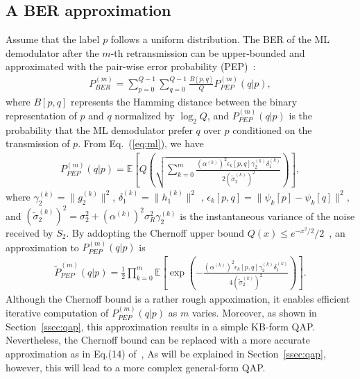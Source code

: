 \documentclass{article}
\begin{document}
\subsection{A BER approximation}
\label{ssec:ber}
Assume that the label $p$ follows a uniform distribution. The BER of
the ML demodulator after the $m$-th retransmission can be upper-bounded and
approximated with the pair-wise error probability (PEP)~\cite{harvind2005symbol}:
\begin{align}
  P_{BER}^{(m)} = \sum_{p=0}^{Q - 1}\sum_{q=0}^{Q - 1}\frac{B[p,
  q]}{Q}P_{PEP}^{(m)}(q|p), \label{eq:P_BER}
\end{align}
where $B[p,q]$ represents the Hamming distance between the binary representation
of $p$ and $q$ normalized by $\log_2Q$, and $P_{PEP}^{(m)}(q|p)$ is the
probability that the ML demodulator prefer $q$ over $p$ conditioned on the
transmission of $p$. From Eq.~(\ref{eq:ml}), we have
\begin{align}
  P_{PEP}^{(m)}(q|p) = \mathbb{E}
  \left[Q\left(\sqrt{\sum_{k=0}^m \frac{(\alpha^{(k)})^2\epsilon_k[p,q]
  \gamma_2^{(k)} \delta_1^{(k)}} {2(\tilde{\sigma}_2^{(k)})^2}}\right)\right],
  \label{eq:PEP_m}
\end{align}
where $\gamma_2^{(k)} = \|g_2^{(k)}\|^2$, $\delta_1^{(k)} = \|h_1^{(k)}\|^2$
, $\epsilon_k[p,q] = \|\psi_k[p]-\psi_k[q]\|^2$, and $(\tilde{\sigma}_2^{(k)})^2
= \sigma_2^2+(\alpha^{(k)})^2\sigma_R^2\gamma_2^{(k)}$ is the instantaneous
variance of the noise received by $S_2$. By addopting the Chernoff upper bound
$Q(x)\leq e^{-x^2/2}/2$~\cite{proakisdigital}, an approximation to
$P_{PEP}^{(m)}(q|p)$ is
\begin{align}
  \tilde{P}_{PEP}^{(m)}(q|p) = \frac{1}{2}\prod_{k=0}^{m} \mathbb{E}
  \left[\exp\left( 
  -\frac{(\alpha^{(k)})^2\epsilon_k[p,q]\gamma_2^{(k)} \delta_1^{(k)}}
  {4(\tilde{\sigma}_2^{(k)})^2}
  \right)\right].
  \label{eq:PEP_m_approx}
\end{align}
Although the Chernoff bound is a rather rough appoximation, it
enables efficient iterative computation of $P_{PEP}^{(m)}(q|p)$ as $m$ varies.
Moreover, as shown in Section~\ref{ssec:qap}, this approximation results in a
simple KB-form QAP. Nevertheless, the Chernoff bound can be replaced
with a more accurate approximation as in Eq.(14) of~\cite{chiani2003new},
As will be explained in Section~\ref{ssec:qap}, however, this will lead to a
more complex general-form QAP.
\end{document}
